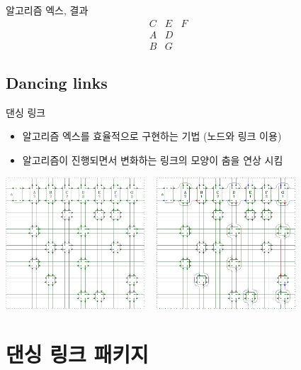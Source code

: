 \documentclass[xcolor=svgnames]{beamer}
\begin{document}
%
\begin{frame}{알고리즘 엑스, 결과}
\Large\boldmath
  $$
  \begin{array}{ccccccc}
    C & E & F &&&&\\
    A & D &&&&&\\
    B & G &&&&&
  \end{array}
  $$
\end{frame}

\subsection{Dancing links}
%
\begin{frame}{댄싱 링크}
  \begin{itemize}
  \item 알고리즘 엑스를 효율적으로 구현하는 기법 (노드와 링크 이용)
  \item 알고리즘이 진행되면서 변화하는 링크의 모양이 춤을 연상 시킴
  \end{itemize}
  \begin{center}
    \includegraphics[height=49mm]{imgs/cdance-2.png}
    ~
    \includegraphics[height=49mm]{imgs/cdance-4.png}
  \end{center}
\end{frame}

%
\section{댄싱 링크 패키지}
\end{document}
